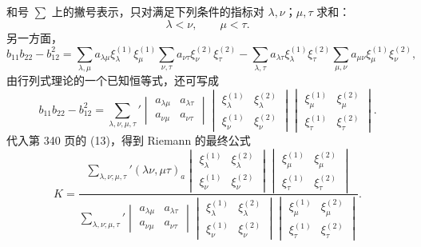 和号 \(\sum\) 上的撇号表示，只对满足下列条件的指标对 \(\lambda,\nu\)；\(\mu,\tau\) 求和：
\[
 \lambda<\nu,
 \qquad \mu<\tau.
\]
另一方面，
\[
 b_{11}b_{22}-b_{12}^2=
 \sum_{\lambda,\mu}a_{\lambda\mu}\xi_\lambda^{(1)}\xi_\mu^{(1)}
 \sum_{\nu,\tau}a_{\nu\tau}\xi_\nu^{(2)}\xi_\tau^{(2)}
 -\sum_{\lambda,\tau}a_{\lambda\tau}\xi_\lambda^{(1)}\xi_\tau^{(2)}
 \sum_{\mu,\nu}a_{\mu\nu}\xi_\mu^{(1)}\xi_\nu^{(2)},
\]
由行列式理论的一个已知恒等式，还可写成
\[
 b_{11}b_{22}-b_{12}^2=\sum_{\lambda,\nu,\mu,\tau}'
 \begin{vmatrix}a_{\lambda\mu}&a_{\lambda\tau}\\a_{\nu\mu}&a_{\nu\tau}\end{vmatrix}
 \begin{vmatrix}\xi_\lambda^{(1)}&\xi_\lambda^{(2)}\\\xi_\nu^{(1)}&\xi_\nu^{(2)}\end{vmatrix}
 \begin{vmatrix}\xi_\mu^{(1)}&\xi_\mu^{(2)}\\\xi_\tau^{(1)}&\xi_\tau^{(2)}\end{vmatrix}.
\]
代入第 340 页的 (13)，得到 Riemann 的最终公式
\begin{equation}\tag{C}
 K=\frac{\displaystyle\sum_{\lambda,\nu;\mu,\tau}'(\lambda\nu,
\mu\tau)_a
 \begin{vmatrix}\xi_\lambda^{(1)}&\xi_\lambda^{(2)}\\\xi_\nu^{(1)}&\xi_\nu^{(2)}\end{vmatrix}
 \begin{vmatrix}\xi_\mu^{(1)}&\xi_\mu^{(2)}\\\xi_\tau^{(1)}&\xi_\tau^{(2)}\end{vmatrix}}
 {\displaystyle\sum_{\lambda,\nu;\mu,\tau}'
 \begin{vmatrix}a_{\lambda\mu}&a_{\lambda\tau}\\a_{\nu\mu}&a_{\nu\tau}\end{vmatrix}
 \begin{vmatrix}\xi_\lambda^{(1)}&\xi_\lambda^{(2)}\\\xi_\nu^{(1)}&\xi_\nu^{(2)}\end{vmatrix}
 \begin{vmatrix}\xi_\mu^{(1)}&\xi_\mu^{(2)}\\\xi_\tau^{(1)}&\xi_\tau^{(2)}\end{vmatrix}}.
\end{equation}
